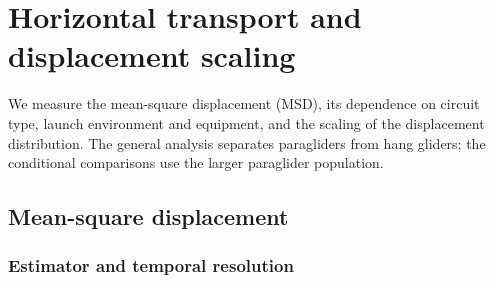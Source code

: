 \chapter{Horizontal transport and displacement scaling}
\label{ch:fixed-transport}







We measure the mean-square displacement (MSD), its dependence on circuit type,
launch environment and equipment, and the scaling of the displacement distribution.
The general analysis separates paragliders from hang gliders; the conditional
comparisons use the larger paraglider population.

\section{Mean-square displacement}
\label{sec:fixed-msd}
\subsection{Estimator and temporal resolution}

